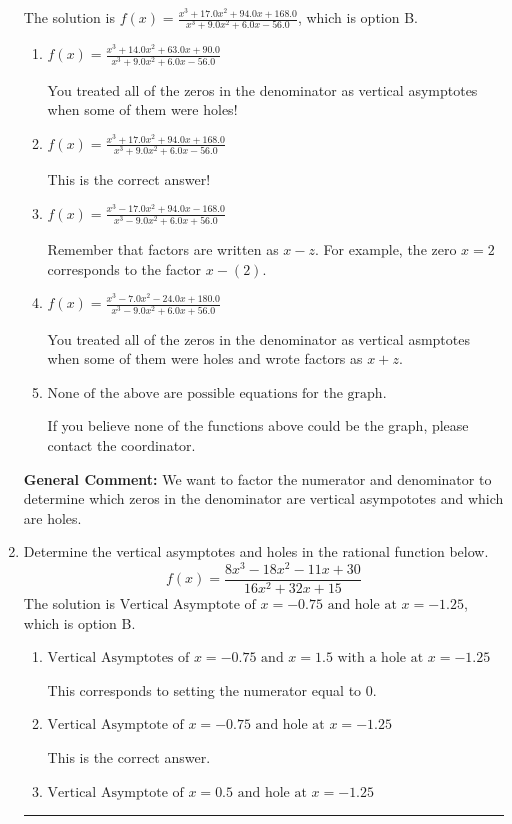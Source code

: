 \documentclass{extbook}[14pt]
\newcommand{\litem}[1]{\item #1

\rule{\textwidth}{0.4pt}}
\begin{document}
\begin{enumerate}
{The solution is \( f(x)=\frac{x^{3} +17.0 x^{2} +94.0 x + 168.0}{x^{3} +9.0 x^{2} +6.0 x -56.0} \), which is option B.\begin{enumerate}[label=\Alph*.]
\item \( f(x)=\frac{x^{3} +14.0 x^{2} +63.0 x + 90.0}{x^{3} +9.0 x^{2} +6.0 x -56.0} \)

You treated all of the zeros in the denominator as vertical asymptotes when some of them were holes!
\item \( f(x)=\frac{x^{3} +17.0 x^{2} +94.0 x + 168.0}{x^{3} +9.0 x^{2} +6.0 x -56.0} \)

This is the correct answer!
\item \( f(x)=\frac{x^{3} -17.0 x^{2} +94.0 x -168.0}{x^{3} -9.0 x^{2} +6.0 x + 56.0} \)

Remember that factors are written as $x-z$. For example, the zero $x=2$ corresponds to the factor $x-(2)$.
\item \( f(x)=\frac{x^{3} -7.0 x^{2} -24.0 x + 180.0}{x^{3} -9.0 x^{2} +6.0 x + 56.0} \)

You treated all of the zeros in the denominator as vertical asmptotes when some of them were holes and wrote factors as $x+z$.
\item \( \text{None of the above are possible equations for the graph.} \)

If you believe none of the functions above could be the graph, please contact the coordinator.
\end{enumerate}

\textbf{General Comment:} We want to factor the numerator and denominator to determine which zeros in the denominator are vertical asympototes and which are holes.
}
\litem{
Determine the vertical asymptotes and holes in the rational function below.
\[ f(x) = \frac{8x^{3} -18 x^{2} -11 x + 30}{16x^{2} +32 x + 15} \]The solution is \( \text{Vertical Asymptote of } x = -0.75 \text{ and hole at } x = -1.25 \), which is option B.\begin{enumerate}[label=\Alph*.]
\item \( \text{Vertical Asymptotes of } x = -0.75 \text{ and } x = 1.5 \text{ with a hole at } x = -1.25 \)

This corresponds to setting the numerator equal to 0.
\item \( \text{Vertical Asymptote of } x = -0.75 \text{ and hole at } x = -1.25 \)

This is the correct answer.
\item \( \text{Vertical Asymptote of } x = 0.5 \text{ and hole at } x = -1.25 \)


\end{enumerate}}
\end{enumerate}
\end{document}
